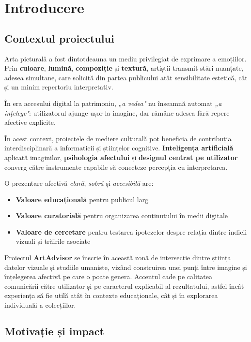 \chapter{Introducere}
\label{ch:introducere}

\section{Contextul proiectului}
\label{sec:intro-context}

Arta picturală a fost dintotdeauna un mediu privilegiat de exprimare a emoțiilor. Prin \textbf{culoare}, \textbf{lumină}, \textbf{compoziție} și \textbf{textură}, artiștii transmit stări nuanțate, adesea simultane, care solicită din partea publicului atât sensibilitate estetică, cât și un minim repertoriu interpretativ. 

În era accesului digital la patrimoniu, \emph{„a vedea"} nu înseamnă automat \emph{„a înțelege"}: utilizatorul ajunge ușor la imagine, dar rămâne adesea fără repere afective explicite.

În acest context, proiectele de mediere culturală pot beneficia de contribuția interdisciplinară a informaticii și științelor cognitive. \textbf{Inteligența artificială} aplicată imaginilor, \textbf{psihologia afectului} și \textbf{designul centrat pe utilizator} converg către instrumente capabile să conecteze percepția cu interpretarea. 

O prezentare afectivă \emph{clară}, \emph{sobră} și \emph{accesibilă} are:
\begin{itemize}
    \item \textbf{Valoare educațională} pentru publicul larg
    \item \textbf{Valoare curatorială} pentru organizarea conținutului în medii digitale
    \item \textbf{Valoare de cercetare} pentru testarea ipotezelor despre relația dintre indicii vizuali și trăirile asociate
\end{itemize}

Proiectul \textbf{ArtAdvisor} se înscrie în această zonă de intersecție dintre știința datelor vizuale și studiile umaniste, vizând construirea unei punți între imagine și înțelegerea afectivă pe care o poate genera. Accentul cade pe calitatea comunicării către utilizator și pe caracterul explicabil al rezultatului, astfel încât experiența să fie utilă atât în contexte educaționale, cât și în explorarea individuală a colecțiilor.

\section{Motivație și impact}
\label{sec:intro-motivatie}

